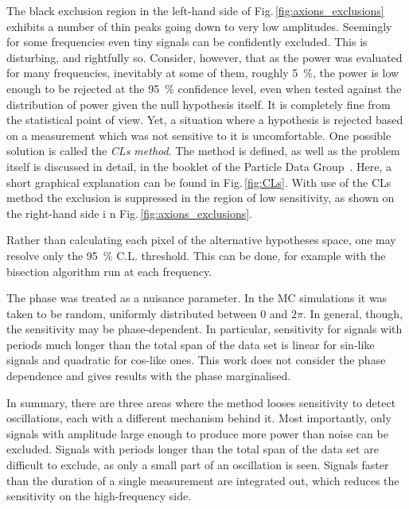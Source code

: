 The black exclusion region in the left-hand side of Fig.\,\ref{fig:axions_exclusions} exhibits a number of thin peaks going down to very low amplitudes. Seemingly for some frequencies even tiny signals can be confidently excluded. This is disturbing, and rightfully so.
Consider, however, that as the power was evaluated for many frequencies, inevitably at some of them, roughly \SI{5}{\percent}, the power is low enough to be rejected at the \SI{95}{\percent} confidence level, even when tested against the distribution of power given the null hypothesis itself.
It is completely fine from the statistical point of view. Yet, a situation where a hypothesis is rejected based on a measurement which was not sensitive to it is uncomfortable.
One possible solution is called the \emph{CLs method}. The method is defined, as well as the problem itself is discussed in detail, in the booklet of the Particle Data Group~\cite{PDG2016}. Here, a short graphical explanation can be found in Fig.\,\ref{fig:CLs}. With use of the CLs method the exclusion is suppressed in the region of low sensitivity, as shown on the right-hand side i n Fig.\,\ref{fig:axions_exclusions}.

Rather than calculating each pixel of the alternative hypotheses space, one may resolve only the \SI{95}{\percent} C.L. threshold. This can be done, for example with the bisection algorithm run at each frequency.

The phase was treated as a nuisance parameter. In the MC simulations it was taken to be random, uniformly distributed between $0$ and $2\pi$. In general, though, the sensitivity may be phase-dependent. In particular, sensitivity for signals with periods much longer than the total span of the data set is linear for sin-like signals and quadratic for cos-like ones. This work does not consider the phase dependence and gives results with the phase marginalised.

In summary, there are three areas where the method looses sensitivity to detect oscillations, each with a different mechanism behind it. Most importantly, only signals with amplitude large enough to produce more power than noise can be excluded. Signals with periods longer than the total span of the data set are difficult to exclude, as only a small part of an oscillation is seen. Signals faster than the duration of a single measurement are integrated out, which reduces the sensitivity on the high-frequency side.




